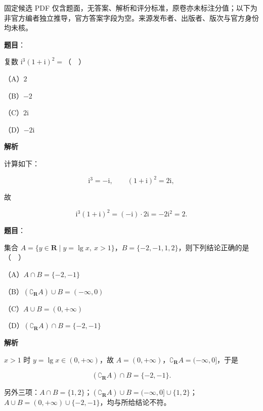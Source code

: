 

\begin{gktip}
固定候选 PDF 仅含题面，无答案、解析和评分标准，原卷亦未标注分值；以下为非官方编者独立推导，官方答案字段为空。来源发布者、出版者、版次与官方身份均未核。
\end{gktip}

\begin{answer}

\textbf{题目}：

复数 $\mathrm i^3(1+\mathrm i)^2=$（　）

（A）$2$

（B）$-2$

（C）$2\mathrm i$

（D）$-2\mathrm i$

\textbf{解析}

计算如下：

\nopagebreak[4]
\[\mathrm i^3=-\mathrm i,\qquad (1+\mathrm i)^2=2\mathrm i,\]

故

\nopagebreak[4]
\[\mathrm i^3(1+\mathrm i)^2=(-\mathrm i)\cdot2\mathrm i=-2\mathrm i^2=2.\]


\end{answer}
\begin{answer}

\textbf{题目}：

集合 $A=\{y\in\mathbf R\mid y=\lg x,\ x>1\}$，$B=\{-2,-1,1,2\}$，则下列结论正确的是（　）

（A）$A\cap B=\{-2,-1\}$

（B）$(\complement_{\mathbf R}A)\cup B=(-\infty,0)$

（C）$A\cup B=(0,+\infty)$

（D）$(\complement_{\mathbf R}A)\cap B=\{-2,-1\}$

\textbf{解析}

$x>1$ 时 $y=\lg x\in(0,+\infty)$，故 $A=(0,+\infty)$，$\complement_{\mathbf R}A=(-\infty,0]$，于是

\nopagebreak[4]
\[(\complement_{\mathbf R}A)\cap B=\{-2,-1\}.\]

另外三项：$A\cap B=\{1,2\}$；$(\complement_{\mathbf R}A)\cup B=(-\infty,0]\cup\{1,2\}$；$A\cup B=(0,+\infty)\cup\{-2,-1\}$，均与所给结论不符。


\end{answer}
